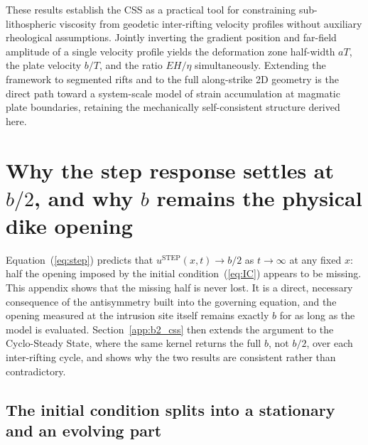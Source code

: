 \documentclass[extra]{gji}
\begin{document}
These results establish the CSS as a practical tool for constraining
sub-lithospheric viscosity from geodetic inter-rifting velocity profiles
without auxiliary rheological assumptions.  Jointly inverting the gradient
position and far-field amplitude of a single velocity profile yields the
deformation zone half-width $aT$, the plate velocity $b/T$, and the
ratio $EH/\eta$ simultaneously.  Extending the framework to segmented rifts and to the full along-strike
2D geometry is the direct path toward a system-scale model of strain
accumulation at magmatic plate boundaries, retaining the
mechanically self-consistent structure derived here.

\appendix
\section{Why the step response settles at \texorpdfstring{$b/2$}{b/2}, and why \texorpdfstring{$b$}{b} remains the physical dike opening}
\label{app:b2}

Equation~(\ref{eq:step}) predicts that $u^{\text{STEP}}(x,t)\to b/2$ as
$t\to\infty$ at any fixed $x$: half the opening imposed by the initial
condition~(\ref{eq:IC}) appears to be missing. This appendix shows that the
missing half is never lost. It is a direct, necessary consequence of the
antisymmetry built into the governing equation, and the opening measured at
the intrusion site itself remains exactly $b$ for as long as the model is
evaluated. Section~\ref{app:b2_css} then extends the argument to the
Cyclo-Steady State, where the same kernel returns the full $b$, not $b/2$,
over each inter-rifting cycle, and shows why the two results are
consistent rather than contradictory.

\subsection{The initial condition splits into a stationary and an evolving part}
\end{document}
